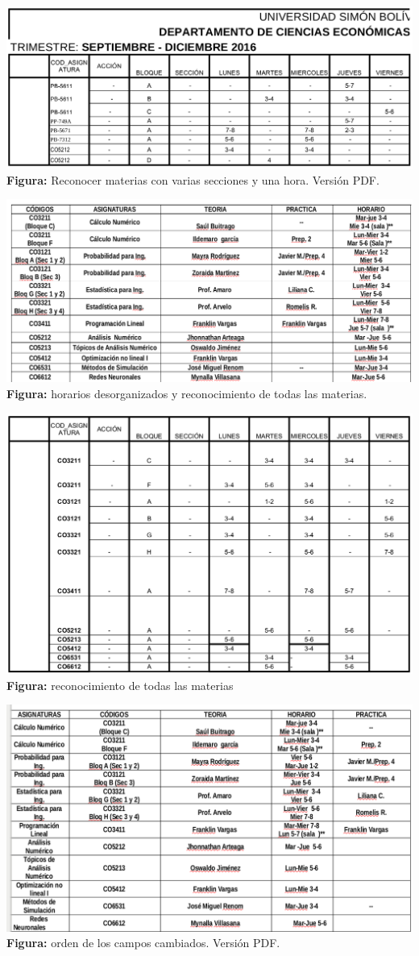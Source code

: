 \documentclass[]{article}
\begin{document}
\includegraphics{casos_pruebas/doc2PDF.png} \textbf{Figura:} Reconocer
materias con varias secciones y una hora. Versión PDF.

\includegraphics{casos_pruebas/doc3DOC.png} \textbf{Figura:} horarios
desorganizados y reconocimiento de todas las materias.

\includegraphics{casos_pruebas/doc3PDF.png} \textbf{Figura:}
reconocimiento de todas las materias

\includegraphics{casos_pruebas/doc4DOC.png} \textbf{Figura:} orden de
los campos cambiados. Versión PDF.
\end{document}
